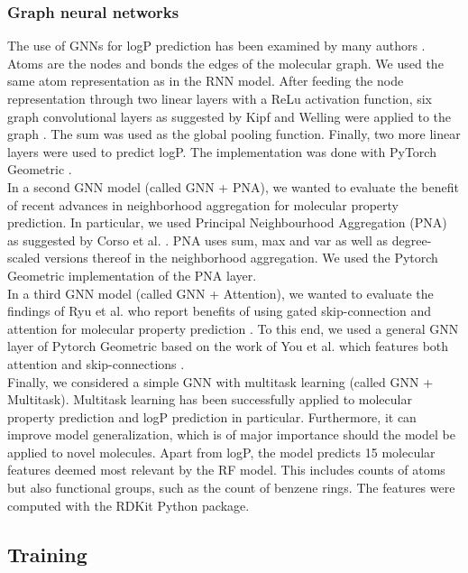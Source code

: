 \documentclass{article}
\begin{document}
\subsubsection{Graph neural networks}

The use of GNNs for logP prediction has been examined by many authors \cite{wieder2020compact}. Atoms are the nodes and bonds the edges of the molecular graph. We used the same atom representation as in the RNN model. After feeding the node representation through two linear layers with a ReLu activation function, six graph convolutional layers as suggested by Kipf and Welling were applied to the graph \cite{welling2016semi}. The sum was used as the global pooling function. Finally, two more linear layers were used to predict logP. The implementation was done with PyTorch Geometric \cite{fey2019fast}. \\

In a second GNN model (called GNN + PNA), we wanted to evaluate the benefit of recent advances in neighborhood aggregation for molecular property prediction. In particular, we used Principal Neighbourhood Aggregation (PNA) as suggested by Corso et al. \cite{corso2020principal}. PNA uses sum, max and var as well as degree-scaled versions thereof in the neighborhood aggregation. We used the Pytorch Geometric implementation of the PNA layer.\\

In a third GNN model (called GNN + Attention), we wanted to evaluate the findings of Ryu et al. who report benefits of using gated skip-connection and attention for molecular property prediction \cite{ryu2018deeply}. To this end, we used a general GNN layer of Pytorch Geometric based on the work of You et al. which features both attention and skip-connections \cite{you2020design}. \\

Finally, we considered a simple GNN with multitask learning (called GNN + Multitask). Multitask learning has been successfully applied to molecular property prediction and logP prediction in particular. Furthermore, it can improve model generalization, which is of major importance should the model be applied to novel molecules. Apart from logP, the model predicts 15 molecular features deemed most relevant by the RF model. This includes counts of atoms but also functional groups, such as the count of benzene rings. The features were computed with the RDKit Python package. \\

\subsection{Training}
\end{document}
